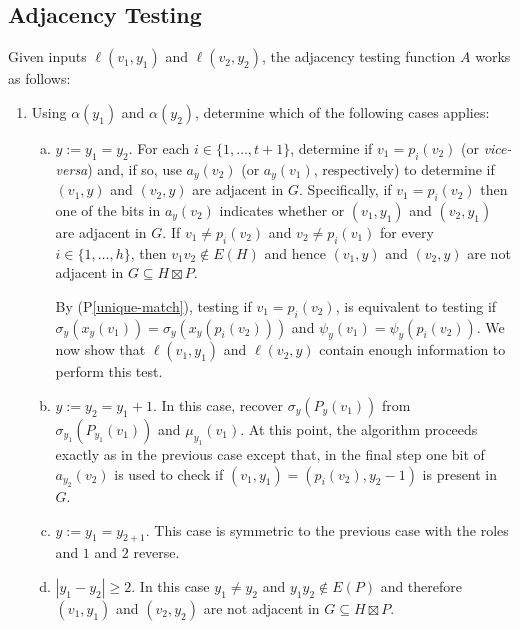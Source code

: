 \documentclass{patmorin}
\newcommand{\pref}[1]{(P\ref{#1})}
\begin{document}
\subsection{Adjacency Testing}

Given inputs $\ell(v_1,y_1)$ and $\ell(v_2,y_2)$, the adjacency testing function $A$ works as follows:
\begin{enumerate}
    \item Using $\alpha(y_1)$ and $\alpha(y_2)$, determine which of the following cases applies:
    \begin{enumerate}[(a)]
        \item $y:=y_1=y_2$.  For each $i\in\{1,\ldots,t+1\}$, determine if $v_1=p_i(v_2)$ (or \textit{vice-versa}) and, if so, use $a_y(v_2)$ (or $a_y(v_1)$, respectively) to determine if $(v_1,y)$ and $(v_2,y)$ are adjacent in $G$. Specifically, if $v_1=p_i(v_2)$ then one of the bits in $a_y(v_2)$ indicates whether or $(v_1,y_1)$ and $(v_2,y_1)$ are adjacent in $G$. If $v_1\neq p_i(v_2)$ and $v_2\neq p_i(v_1)$ for every $i\in\{1,\ldots,h\}$, then $v_1v_2\not\in E(H)$ and hence $(v_1,y)$ and $(v_2,y)$ are not adjacent in $G\subseteq H\boxtimes P$.

        By \pref{unique-match}, testing if $v_1=p_i(v_2)$, is equivalent to testing if $\sigma_y(x_y(v_1))=\sigma_y(x_y(p_i(v_2)))$ and $\psi_y(v_1)=\psi_y(p_i(v_2))$. We now show that $\ell(v_1,y_1)$ and $\ell(v_2,y)$ contain enough information to perform this test.
        \item $y:=y_2=y_1+1$.  In this case, recover $\sigma_y(P_y(v_1))$ from $\sigma_{y_1}(P_{y_1}(v_1))$ and $\mu_{y_1}(v_1)$.  At this point, the algorithm proceeds exactly as in the previous case except that, in the final step one bit of $a_{y_2}(v_2)$ is used to check if $(v_1,y_1)=(p_i(v_2),y_2-1)$ is present in $G$.

        \item $y:=y_1=y_{2+1}$. This case is symmetric to the previous case with the roles and $1$ and $2$ reverse.

        \item $|y_1-y_2|\ge 2$.  In this case $y_1\neq y_2$ and $y_1y_2\not\in E(P)$ and therefore $(v_1,y_1)$ and $(v_2,y_2)$ are not adjacent in $G\subseteq H\boxtimes P$.
    \end{enumerate}
\end{enumerate}
\end{document}
